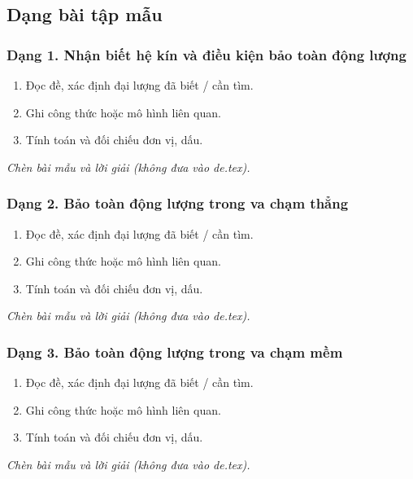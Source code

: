 

\subsection{Dạng bài tập mẫu}
\subsubsection{Dạng 1. Nhận biết hệ kín và điều kiện bảo toàn động lượng}
\begin{phuongphap}
\begin{enumerate}
\item Đọc đề, xác định đại lượng đã biết / cần tìm.
\item Ghi công thức hoặc mô hình liên quan.
\item Tính toán và đối chiếu đơn vị, dấu.
\end{enumerate}
\end{phuongphap}
\begin{vidumau}
\textit{Chèn bài mẫu và lời giải (không đưa vào de.tex).}
\end{vidumau}

\subsubsection{Dạng 2. Bảo toàn động lượng trong va chạm thẳng}
\begin{phuongphap}
\begin{enumerate}
\item Đọc đề, xác định đại lượng đã biết / cần tìm.
\item Ghi công thức hoặc mô hình liên quan.
\item Tính toán và đối chiếu đơn vị, dấu.
\end{enumerate}
\end{phuongphap}
\begin{vidumau}
\textit{Chèn bài mẫu và lời giải (không đưa vào de.tex).}
\end{vidumau}

\subsubsection{Dạng 3. Bảo toàn động lượng trong va chạm mềm}
\begin{phuongphap}
\begin{enumerate}
\item Đọc đề, xác định đại lượng đã biết / cần tìm.
\item Ghi công thức hoặc mô hình liên quan.
\item Tính toán và đối chiếu đơn vị, dấu.
\end{enumerate}
\end{phuongphap}
\begin{vidumau}
\textit{Chèn bài mẫu và lời giải (không đưa vào de.tex).}
\end{vidumau}


